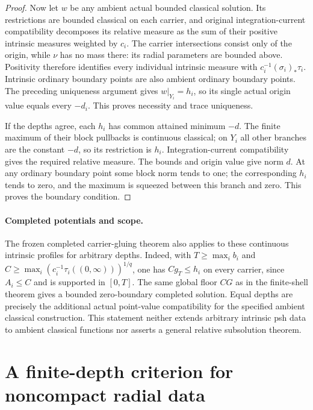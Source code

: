 \documentclass[11pt,a4paper]{article}
\numberwithin{equation}{section}
\theoremstyle{definition}
\theoremstyle{remark}
\begin{document}
\begin{proof}
Now let $w$ be any ambient actual bounded classical solution. Its
restrictions are bounded classical on each carrier, and original
integration-current compatibility decomposes its relative measure
as the sum of their positive intrinsic measures weighted by $c_i$.
The carrier intersections consist only of the origin, while $\nu$
has no mass there: its radial parameters are bounded above. Positivity
therefore identifies every individual intrinsic measure with
$c_i^{-1}(\sigma_i)_*\tau_i$. Intrinsic ordinary boundary points
are also ambient ordinary boundary points. The preceding uniqueness
argument gives $w|_{Y_i}=h_i$, so its single actual origin value
equals every $-d_i$. This proves necessity and trace uniqueness.

If the depths agree, each $h_i$ has common attained minimum $-d$.
The finite maximum of their block pullbacks is continuous classical;
on $Y_i$ all other branches are the constant $-d$, so its restriction
is $h_i$. Integration-current compatibility gives the required
relative measure. The bounds and origin value give norm $d$.
At any ordinary boundary point some block norm tends to one; the
corresponding $h_i$ tends to zero, and the maximum is squeezed between
this branch and zero. This proves the boundary condition.
\end{proof}

\paragraph{Completed potentials and scope.}
The frozen completed carrier-gluing theorem also applies to these
continuous intrinsic profiles for arbitrary depths. Indeed, with
$T\ge\max_i b_i$ and
$C\ge\max_i(c_i^{-1}\tau_i((0,\infty)))^{1/q}$, one has
$C g_T\le h_i$ on every carrier, since $A_i\le C$ and is supported
in $[0,T]$. The same global floor $CG$ as in the finite-shell theorem
gives a bounded zero-boundary completed solution. Equal depths are
precisely the additional actual point-value compatibility for the
specified ambient classical construction. This statement neither
extends arbitrary intrinsic psh data to ambient classical functions
nor asserts a general relative subsolution theorem.



\section{A finite-depth criterion for noncompact radial data}
\label{sec:r6-radial-tail-depth}
\end{document}
